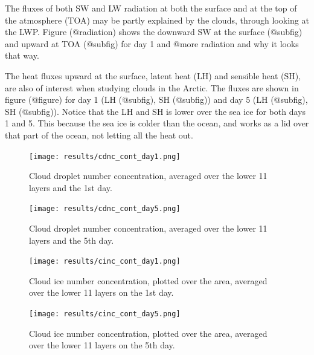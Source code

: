 The fluxes of both SW and LW radiation at both the surface and at the top of the atmosphere (TOA) may be partly explained by the clouds, through looking at the LWP. Figure (@radiation) shows the downward SW at the surface (@subfig) and upward at TOA (@subfig) for day 1 and @more radiation and why it looks that way.

The heat fluxes upward at the surface, latent heat (LH) and sensible heat (SH), are also of interest when studying clouds in the Arctic. The fluxes are shown in figure (@figure) for day 1 (LH (@subfig), SH (@subfig)) and day 5 (LH (@subfig), SH (@subfig)). Notice that the LH and SH is lower over the sea ice for both days 1 and 5. This because the sea ice is colder than the ocean, and works as a lid over that part of the ocean, not letting all the heat out.

\begin{figure}[h]
\centering
\texttt{[image: results/cdnc\_cont\_day1.png]}
\caption{Cloud droplet number concentration, averaged over the lower 11 layers and the 1st day.}
\label{fig:cdnc_cont_Day1}
\end{figure}

\begin{figure}[h]
\centering
\texttt{[image: results/cdnc\_cont\_day5.png]}
\caption{Cloud droplet number concentration, averaged over the lower 11 layers and the 5th day.}
\label{fig:cdnc_cont_Day5}
\end{figure}

\begin{figure}[h]
\centering
\texttt{[image: results/cinc\_cont\_day1.png]}
\caption{Cloud ice number concentration, plotted over the area, averaged over the lower 11 layers on the 1st day.}
\label{fig:cinc_cont_Day1}
\end{figure}

\begin{figure}[h]
\centering
\texttt{[image: results/cinc\_cont\_day5.png]}
\caption{Cloud ice number concentration, plotted over the area, averaged over the lower 11 layers on the 5th day.}
\label{fig:cinc_cont_Day5}
\end{figure}


